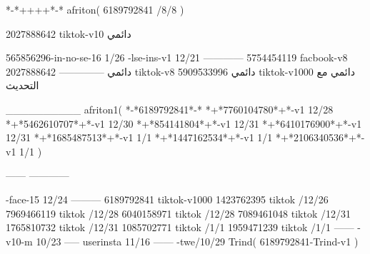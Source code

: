 *-*++++*-*
afriton(
6189792841 /8/8
)

2027888642 tiktok-v10
دائمي

565856296-in-no-se-16 1/26
-lse-ins-v1 12/21
------------
5754454119 facbook-v8
دائمي
--------------
2027888642 tiktok-v8
دائمي
5909533996 tiktok-v1000
دائمي مع التحديث

__________
afriton1(
*-*6189792841*-*
*+*7760104780*+*-v1 12/28
*+*5462610707*+*-v1 12/30
*+*854141804*+*-v1 12/31
*+*6410176900*+*-v1 12/31
*+*1685487513*+*-v1 1/1
*+*1447162534*+*-v1 1/1
*+*2106340536*+*-v1 1/1
)

------
------------

-face-15 12/24
---------
6189792841 tiktok-v1000
1423762395 tiktok /12/26
7969466119 tiktok /12/28
6040158971 tiktok /12/28
7089461048 tiktok /12/31
1765810732 tiktok /12/31
1085702771 tiktok /1/1
1959471239 tiktok /1/1
------
-v10-m 10/23
-----
userinsta 11/16
------
-twe/10/29
Trind(
6189792841-Trind-v1 
)
